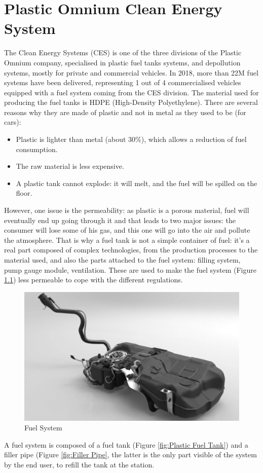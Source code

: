 \chapter{Plastic Omnium Clean Energy System} \label{Plastic Omnium}


The Clean Energy Systems (CES) is one of the three divisions of the Plastic Omnium company, specialised in plastic fuel tanks systems, and depollution systems, mostly for private and commercial vehicles. In 2018, more than 22M fuel systems have been delivered, representing 1 out of 4 commercialised vehicles equipped with a fuel system coming from the CES division.
The material used for producing the fuel tanks is HDPE (High-Density Polyethylene). There are several reasons why they are made of plastic and not in metal as they used to be (for cars):
\begin{itemize}
    \item Plastic is lighter than metal (about 30\%), which allows a reduction of fuel consumption.
    \item The raw material is less expensive.
    \item A plastic tank cannot explode: it will melt, and the fuel will be spilled on the floor.
\end{itemize}

However, one issue is the permeability: as plastic is a porous material, fuel will eventually end up going through it and that leads to two major issues: the consumer will lose some of his gas, and this one will go into the air and pollute the atmosphere. That is why a fuel tank is not a simple container of fuel: it’s a real part composed of complex technologies, from the production processes to the material used, and also the parts attached to the fuel system: filling system, pump gauge module, ventilation. These are used to make the fuel system (Figure \ref{fig:Fuel System}) less permeable to cope with the different regulations.
\begin{figure}
\centerline{\includegraphics[scale=0.4]{images/appendix_A/fuel_system.png}}
\caption{Fuel System}
\label{fig:Fuel System}
\end{figure}
A fuel system is composed of a fuel tank (Figure \ref{fig:Plastic Fuel Tank}) and a filler pipe (Figure \ref{fig:Filler Pipe}, the latter is the only part visible of the system by the end user, to refill the tank at the station.


